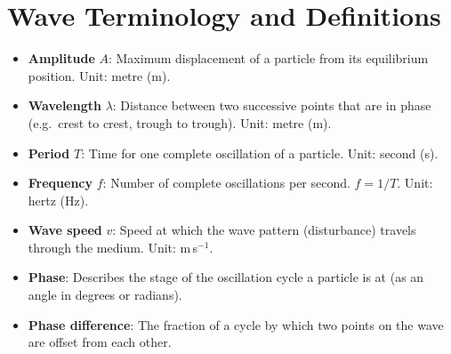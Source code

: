 \begin{diagbox}
\begin{center}
\end{center}
\end{diagbox}

\section{Wave Terminology and Definitions}

\begin{definitionbox}
\begin{itemize}[noitemsep]
  \item \textbf{Amplitude} $A$: Maximum displacement
  of a particle from its equilibrium position. Unit: metre (m).

  \item \textbf{Wavelength} $\lambda$: Distance
  between two successive points that are in phase
  (e.g.\ crest to crest, trough to trough).
  Unit: metre (m).

  \item \textbf{Period} $T$: Time for one complete
  oscillation of a particle. Unit: second (s).

  \item \textbf{Frequency} $f$: Number of complete
  oscillations per second.
  $f = 1/T$. Unit: hertz (Hz).

  \item \textbf{Wave speed} $v$: Speed at which
  the wave pattern (disturbance) travels through
  the medium. Unit: m\,s$^{-1}$.

  \item \textbf{Phase}: Describes the stage of
  the oscillation cycle a particle is at (as an
  angle in degrees or radians).

  \item \textbf{Phase difference}: The fraction
  of a cycle by which two points on the wave are
  offset from each other.
\end{itemize}
\end{definitionbox}


